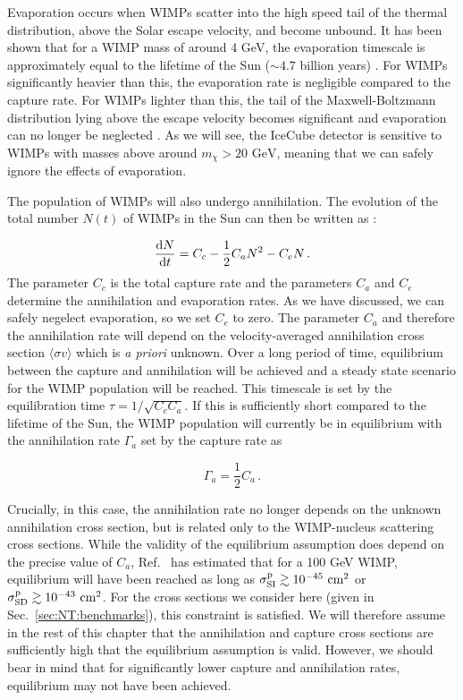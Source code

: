 Evaporation occurs when WIMPs scatter into the high speed tail of the thermal distribution, above the Solar escape velocity, and become unbound. It has been shown that for a WIMP mass of around 4 GeV, the evaporation timescale is approximately equal to the lifetime of the Sun ($\sim4.7$ billion years) \cite{Gould:1987b}. For WIMPs significantly heavier than this, the evaporation rate is negligible compared to the capture rate. For WIMPs lighter than this, the tail of the Maxwell-Boltzmann distribution lying above the escape velocity becomes significant and evaporation can no longer be neglected \cite{Krauss:1986,Busoni:2013b}. As we will see, the IceCube detector is sensitive to WIMPs with masses above around $m_\chi > 20 \textrm{ GeV} $, meaning that we can safely ignore the effects of evaporation.

The population of WIMPs will also undergo annihilation. The evolution of the total number $N(t)$ of WIMPs in the Sun can then be written as \cite{Griest:1987}:

\begin{equation}
\frac{\mathrm{d}N}{\mathrm{d}t} = C_c - \frac{1}{2}C_a N^2 - C_e N\,.
\end{equation}
The parameter $C_c$ is the total capture rate and the parameters $C_a$ and $C_e$ determine the annihilation and evaporation rates. As we have discussed, we can safely negelect evaporation, so we set $C_e$ to zero. The parameter $C_a$ and therefore the annihilation rate will depend on the velocity-averaged annihilation cross section $\langle \sigma v \rangle$ which is \textit{a priori} unknown. Over a long period of time, equilibrium between the capture and annihilation will be achieved and a steady state scenario for the WIMP population will be reached. This timescale is set by the equilibration time $\tau = 1/\sqrt{C_c C_a}$. If this is sufficiently short compared to the lifetime of the Sun, the WIMP population will currently be in equilibrium with the annihilation rate $\Gamma_a$ set by the capture rate as

\begin{equation}
\Gamma_a = \frac{1}{2}C_a\,.
\end{equation}


Crucially, in this case, the annihilation rate no longer depends on the unknown annihilation cross section, but is related only to the WIMP-nucleus scattering cross sections. While the validity of the equilibrium assumption does depend on the precise value of $C_a$, Ref.~\cite{Peter:2009} has estimated that for a 100 GeV WIMP, equilibrium will have been reached as long as $\sigmapsi \gtrsim 10^{-45} \cmsq$ or $\sigmapsd \gtrsim 10^{-43} \cmsq$. For the cross sections we consider here (given in Sec.~\ref{sec:NT:benchmarks}), this constraint is satisfied. We will therefore assume in the rest of this chapter that the annihilation and capture cross sections are sufficiently high that the equilibrium assumption is valid. However, we should bear in mind that for significantly lower capture and annihilation rates, equilibrium may not have been achieved.

